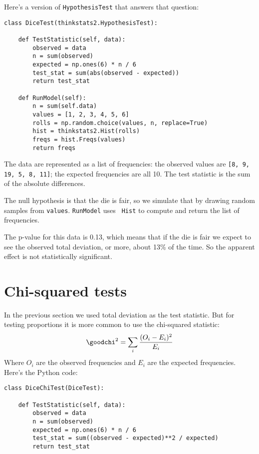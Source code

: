 Here's a version of {\tt HypothesisTest} that answers that question:

\begin{verbatim}
class DiceTest(thinkstats2.HypothesisTest):

    def TestStatistic(self, data):
        observed = data
        n = sum(observed)
        expected = np.ones(6) * n / 6
        test_stat = sum(abs(observed - expected))
        return test_stat

    def RunModel(self):
        n = sum(self.data)
        values = [1, 2, 3, 4, 5, 6]
        rolls = np.random.choice(values, n, replace=True)
        hist = thinkstats2.Hist(rolls)
        freqs = hist.Freqs(values)
        return freqs
\end{verbatim}

The data are represented as a list of frequencies: the observed
values are {\tt [8, 9, 19, 5, 8, 11]}; the expected frequencies
are all 10.  The test statistic is the sum of the absolute differences.

The null hypothesis is that the die is fair, so we simulate that by
drawing random samples from {\tt values}.  {\tt RunModel} uses {\tt
  Hist} to compute and return the list of frequencies.

The p-value for this data is 0.13, which means that if the die is
fair we expect to see the observed total deviation, or more, about
13\% of the time.  So the apparent effect is not statistically
significant.
   


\section{Chi-squared tests}
\label{casino2}

In the previous section we used total deviation as the test statistic.
But for testing proportions it is more common to use the chi-squared
statistic:
%
\[ \goodchi^2 = \sum_i \frac{(O_i - E_i)^2}{E_i} \]
%
% 
Where $O_i$ are the observed frequencies and $E_i$ are the expected
frequencies.  Here's the Python code:

\begin{verbatim}
class DiceChiTest(DiceTest):

    def TestStatistic(self, data):
        observed = data
        n = sum(observed)
        expected = np.ones(6) * n / 6
        test_stat = sum((observed - expected)**2 / expected)
        return test_stat
\end{verbatim}

